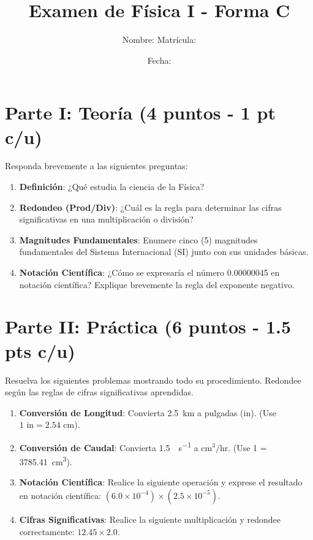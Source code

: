 \documentclass[a4paper,12pt]{article}
\title{Examen de Física I - Forma C}
\author{Nombre: \underline{\hspace{8cm}} \quad Matrícula: \underline{\hspace{3cm}}}
\date{Fecha: \underline{\hspace{4cm}}}
\begin{document}
\maketitle

\section{Parte I: Teoría (4 puntos - 1 pt c/u)}
Responda brevemente a las siguientes preguntas:

\begin{enumerate}[itemsep=2em]
    \item \textbf{Definición}: ¿Qué estudia la ciencia de la Física?
    \item \textbf{Redondeo (Prod/Div)}: ¿Cuál es la regla para determinar las cifras significativas en una multiplicación o división?
    \item \textbf{Magnitudes Fundamentales}: Enumere cinco (5) magnitudes fundamentales del Sistema Internacional (SI) junto con sus unidades básicas.
    \item \textbf{Notación Científica}: ¿Cómo se expresaría el número 0.00000045 en notación científica? Explique brevemente la regla del exponente negativo.
\end{enumerate}

\vspace{2cm}

\section{Parte II: Práctica (6 puntos - 1.5 pts c/u)}
Resuelva los siguientes problemas mostrando todo su procedimiento. Redondee según las reglas de cifras significativas aprendidas.

\begin{enumerate}[itemsep=4em]
    \item \textbf{Conversión de Longitud}: Convierta \SI{2.5}{\km} a pulgadas (in). (Use $1\text{ in} = 2.54\text{ cm}$).
    \item \textbf{Conversión de Caudal}: Convierta \SI{1.5}{\gallon\per\second} a $\text{cm}^3/\text{hr}$. (Use \SI{1}{\gallon} = \SI{3785.41}{\centi\metre^3}).
    \item \textbf{Notación Científica}: Realice la siguiente operación y exprese el resultado en notación científica: $(6.0 \times 10^{-4}) \times (2.5 \times 10^{-5})$.
    \item \textbf{Cifras Significativas}: Realice la siguiente multiplicación y redondee correctamente: $12.45 \times 2.0$.
\end{enumerate}
\end{document}
